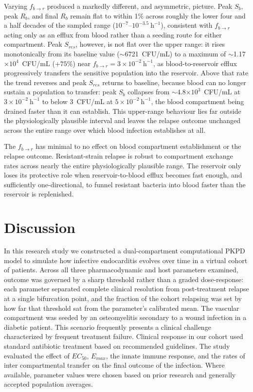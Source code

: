 \documentclass[12pt, draftcls, onecolumn]{IEEEtran}
\begin{document}
Varying $f_{b \to r}$ produced a markedly different, and asymmetric,
picture. Peak $S_b$, peak $R_b$, and final $R_b$ remain flat to within 1\%
across roughly the lower four and a half decades of the sampled range
($10^{-7}$--$10^{-3.5}~\mathrm{h}^{-1}$), consistent with $f_{b \to r}$
acting only as an efflux from blood rather than a seeding route for either
compartment. Peak $S_{res}$, however, is not flat over the upper range: it
rises monotonically from its baseline value ($\sim$6721~CFU/mL) to a maximum
of $\sim$1.17$\times10^{4}$~CFU/mL ($+75\%$) near
$f_{b \to r} = 3\times10^{-2}~\mathrm{h}^{-1}$, as blood-to-reservoir efflux
progressively transfers the sensitive population into the reservoir. Above
that rate the trend reverses and peak $S_{res}$ returns to baseline, because
blood can no longer sustain a population to transfer: peak $S_b$ collapses
from $\sim$4.8$\times10^{3}$~CFU/mL at $3\times10^{-2}~\mathrm{h}^{-1}$ to
below 3~CFU/mL at $5\times10^{-2}~\mathrm{h}^{-1}$, the blood compartment
being drained faster than it can establish. This upper-range behaviour lies
far outside the physiologically plausible interval and leaves the relapse
outcome unchanged across the entire range over which blood infection
establishes at all.

The $f_{b\to r}$ has minimal to no effect on blood compartment establishment or the relapse outcome.  Resistant-strain relapse is robust to
compartment exchange rates across nearly the entire physiologically
plausible range. The reservoir only loses its protective role when
reservoir-to-blood efflux becomes fast enough, and sufficiently
one-directional, to funnel resistant bacteria into blood faster than the
reservoir is replenished.



\section{Discussion}

In this research study we constructed a dual-compartment computational PKPD model to simulate how infective endocarditis evolves over time in a virtual cohort of patients. Across all three pharmacodynamic and host parameters examined, outcome was governed by a sharp threshold rather than a graded dose-response: each parameter separated complete clinical resolution from post-treatment relapse at a single bifurcation point, and the fraction of the cohort relapsing was set by how far that threshold sat from the parameter's calibrated mean. The vascular compartment was seeded by an osteomyelitis secondary to a wound infection in a diabetic patient.  This scenario frequently presents a clinical challenge characterized by frequent
treatment failure. Clinical response in our cohort used standard antibiotic treatment based on recommended guidelines. The study evaluated the effect of $EC_{50}$, $E_{max}$, the innate immune response, and the rates of inter compartmental transfer on the final outcome of the infection. Where available, parameter values were chosen based on prior research and generally accepted population averages.  
\end{document}
